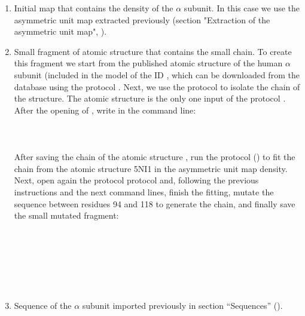   \begin{enumerate}
  \item Initial map that contains the density of the  $\alpha$ subunit. In this case we use the  asymmetric unit map extracted previously (section "Extraction of the asymmetric unit map", ).
  \item Small fragment of atomic structure that contains the  small chain. To create this fragment we start from the published atomic structure of the human  $\alpha$ subunit (included in the model of the  ID , which can be downloaded from the database using the protocol . Next, we use the protocol \chimera {} to isolate the chain  of the structure. The atomic structure  is the only one input of the protocol \chimera {}. After the opening of \chimera, write in the command line:\\
  \\
  \\
  \\
  
  After saving the chain  of the atomic structure , run the protocol  () to fit the chain  from the atomic structure 5NI1 in the  asymmetric unit map density. Next, open again the protocol \chimera {} protocol and, following the previous instructions and the next \chimera command lines, finish the fitting, mutate the sequence between residues 94 and 118 to generate the  chain, and finally save the small mutated fragment:\\
  
  \\
  \\
  \\
  \\
  \\
  \\
  
  \item Sequence of the  $\alpha$ subunit imported previously in section ``Sequences'' ().
  \end{enumerate}
  
